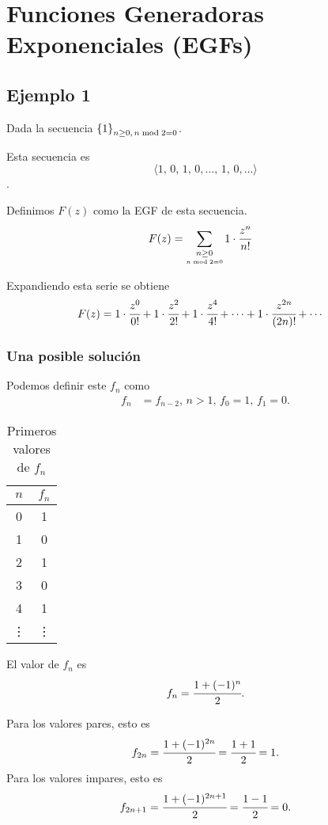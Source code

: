 \section{Funciones Generadoras Exponenciales (EGFs)}

\subsection{Ejemplo 1}

Dada la secuencia $\left\{1\right\}_{n\geq0,\,n\bmod2=0}$.

Esta secuencia es
$$\langle1,\,0,\,1,\,0,\dots,\,1,\,0,\dots\rangle$$.

Definimos $F(z)$ como la EGF de esta secuencia.
\begin{align*}
F(z)&=\sum_{\underset{n\bmod 2=0}{n\geq0}}{1\cdot\cfrac{z^{n}}{n!}}
\end{align*}

Expandiendo esta serie se obtiene
\begin{align*}
F(z)&=1\cdot\cfrac{z^{0}}{0!}+1\cdot\cfrac{z^{2}}{2!}+1\cdot\cfrac{z^{4}}{4!}+\cdots+1\cdot\cfrac{z^{2n}}{(2n)!}+\cdots
\end{align*}

\subsubsection*{Una posible solución}

Podemos definir este $f_n$ como
\begin{align*}
f_n&=f_{n-2},\,n>1,\,f_0=1,\,f_1=0.
\end{align*}
\begin{table}[ht!]	\centering
\begin{tabular}{|c|c|}
\hline
$n$ & $f_n$\\
\hline
0 & 1\\
1 & 0\\
2 & 1\\
3 & 0\\
4 & 1\\
\vdots & \vdots\\
\hline
\end{tabular}
\caption{Primeros valores de $f_n$}
\end{table}

El valor de $f_n$ es
$$f_n=\cfrac{1+(-1)^n}{2}.$$

Para los valores pares, esto es 
$$f_{2n}=\cfrac{1+(-1)^{2n}}{2}=\cfrac{1+1}{2}=1.$$
Para los valores impares, esto es 
$$f_{2n+1}=\cfrac{1+(-1)^{2n+1}}{2}=\cfrac{1-1}{2}=0.$$

